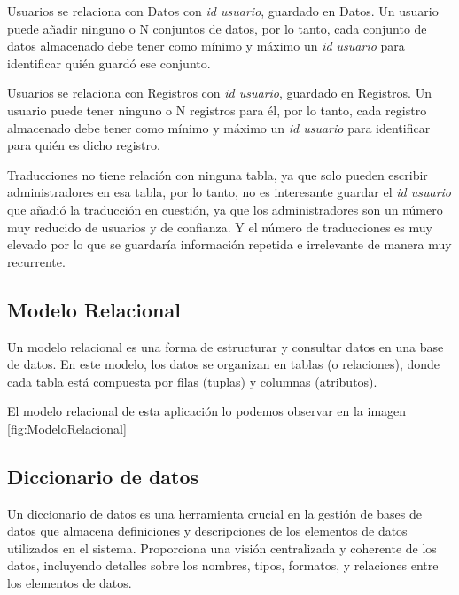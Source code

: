 Usuarios se relaciona con Datos con \textit{id usuario}, guardado en Datos. Un usuario puede añadir ninguno o N conjuntos de datos, por lo tanto, cada conjunto de datos almacenado debe tener como mínimo y máximo un \textit{id usuario} para identificar quién guardó ese conjunto.

Usuarios se relaciona con Registros con \textit{id usuario}, guardado en Registros. Un usuario puede tener ninguno o N registros para él, por lo tanto, cada registro almacenado debe tener como mínimo y máximo un \textit{id usuario} para identificar para quién es dicho registro.

Traducciones no tiene relación con ninguna tabla, ya que solo pueden escribir administradores en esa tabla, por lo tanto, no es interesante guardar el \textit{id usuario} que añadió la traducción en cuestión, ya que los administradores son un número muy reducido de usuarios y de confianza. Y el número de traducciones es muy elevado por lo que se guardaría información repetida e irrelevante de manera muy recurrente.



\subsection{Modelo Relacional}\label{modelo-relacional}

Un modelo relacional es una forma de estructurar y consultar datos en una base de datos. En este modelo, los datos se organizan en tablas (o relaciones), donde cada tabla está compuesta por filas (tuplas) y columnas (atributos). \cite{Codd1970}

El modelo relacional de esta aplicación lo podemos observar en la imagen \ref{fig:ModeloRelacional}



\subsection{Diccionario de datos}\label{diccionario-de-datos}

Un diccionario de datos es una herramienta crucial en la gestión de bases de datos que almacena definiciones y descripciones de los elementos de datos utilizados en el sistema. Proporciona una visión centralizada y coherente de los datos, incluyendo detalles sobre los nombres, tipos, formatos, y relaciones entre los elementos de datos. \cite{Kent1983}

